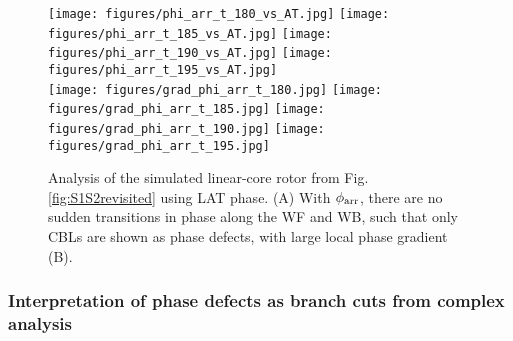 \documentclass[aps,pre,amsfonts,amssymb,amsmath,twocolumn, superscriptaddress]{revtex4-1}
\newcommand{\phiarr}{\ensuremath{\phi_{\rm arr}}}
\newcommand{\figspiralphiarr}{3.5cm}
\begin{document}
\begin{figure*}
     \texttt{[image: figures/phi\_arr\_t\_180\_vs\_AT.jpg]}
    \texttt{[image: figures/phi\_arr\_t\_185\_vs\_AT.jpg]}
    \texttt{[image: figures/phi\_arr\_t\_190\_vs\_AT.jpg]}
    \texttt{[image: figures/phi\_arr\_t\_195\_vs\_AT.jpg]} \\
    
    \texttt{[image: figures/grad\_phi\_arr\_t\_180.jpg]}
    \texttt{[image: figures/grad\_phi\_arr\_t\_185.jpg]}
    \texttt{[image: figures/grad\_phi\_arr\_t\_190.jpg]}
    \texttt{[image: figures/grad\_phi\_arr\_t\_195.jpg]}
        \caption{Analysis of the simulated linear-core rotor from Fig. \ref{fig:S1S2revisited} using {\color{red}LAT} phase. (A) With $\phiarr$, there are no sudden transitions in phase along the WF and WB, such that only CBLs are shown as phase defects, with large local phase gradient (B).  }
    \label{fig:S1S2revisited_phiarr}
\end{figure*}

\subsubsection{Interpretation of phase defects as branch cuts from complex analysis}

\end{document}
